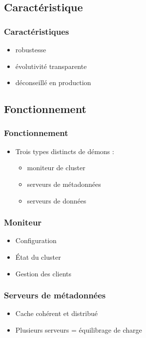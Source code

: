 \documentclass[blue]{beamer}
\begin{document}
        \subsection{Caractéristique}        
        \begin{frame}
                \frametitle{Caractéristiques}
                \begin{itemize}
                        \item robustesse
                        \item évolutivité transparente
                        \item déconseillé en production
                \end{itemize}
        \end{frame}

        \subsection{Fonctionnement}
        \begin{frame}
                \frametitle{Fonctionnement}
                \begin{itemize}
                        \item Trois types distincts de démons :
                        \begin{itemize}
                                \item moniteur de cluster
                                \item serveurs de métadonnées
                                \item serveurs de données
                        \end{itemize}
                \end{itemize}
        \end{frame}

        \begin{frame}
                \frametitle{Moniteur}
                \begin{itemize}
                        \item Configuration
                        \item État du cluster
                        \item Gestion des clients
                \end{itemize}
        \end{frame}

        \begin{frame}
                \frametitle{Serveurs de métadonnées}
                \begin{itemize}
                        \item Cache cohérent et distribué
                        \item Plusieurs serveurs = équilibrage de charge
                \end{itemize}
        \end{frame}
\end{document}
